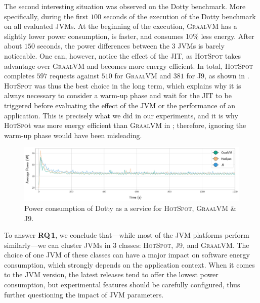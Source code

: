 The second interesting situation was observed on the \textsf{Dotty} benchmark.
More specifically, during the first $100$ seconds of the execution of the \textsf{Dotty} benchmark on all evaluated JVMs.
At the beginning of the execution, \textsc{GraalVM} has a slightly lower power consumption, is faster, and consumes 10\% less energy.
After about $150$ seconds, the power differences between the 3 JVMs is barely noticeable.
One can, however, notice the effect of the JIT, as \textsc{HotSpot} takes advantage over \textsc{GraalVM} and becomes more energy efficient.
In total, \textsc{HotSpot} completes $597$ requests against $510$ for \textsc{GraalVM} and $381$ for \textsc{J9}, as shown in .
\textsc{HotSpot} was thus the best choice in the long term, which explains why it is always necessary to consider a warm-up phase and wait for the JIT to be triggered before evaluating the effect of the JVM or the performance of an application.
This is precisely what we did in our experiments, and it is why \textsc{HotSpo}t was more energy efficient than \textsc{GraalVM} in ; therefore, ignoring the warm-up phase would have been misleading.

\begin{figure}%
    \includegraphics[width=.9\linewidth]{imgs/powers_chetemi-2-dotty.pdf}
    \centering
    \captionsetup{justification=centering}
    \caption{Power consumption of \textsf{Dotty} as a service for \textsc{HotSpot}, \textsc{GraalVM} \& \textsc{J9}.}
    \label{fig:servicedotty}
\end{figure}
\begin{mdframed}[]
    To answer \textbf{RQ\,1}, we conclude that---while most of the JVM platforms perform similarly---we can cluster JVMs in 3 classes: \textsc{HotSpot}, \textsc{J9}, and \textsc{GraalVM}.
    The choice of one JVM of these classes can have a major impact on software energy consumption, which strongly depends on the application context.
    When it comes to the JVM version, the latest releases tend to offer the lowest power consumption, but experimental features should be carefully configured, thus further questioning the impact of JVM parameters.
\end{mdframed}

